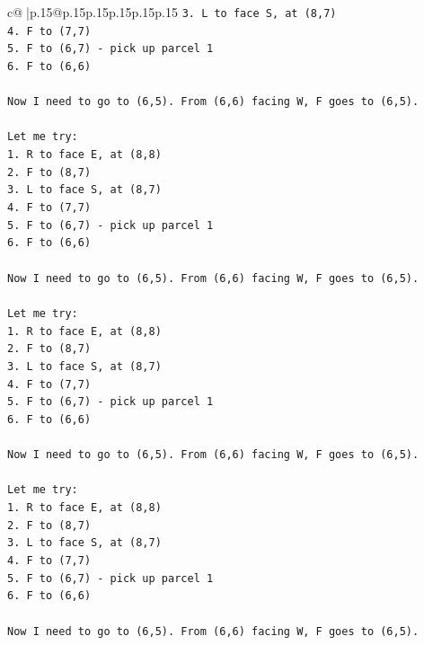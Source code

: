 \documentclass{article}
\begin{document}
{\begin{supertabular}{c@{$\;$}|p{.15\linewidth}@{}p{.15\linewidth}p{.15\linewidth}p{.15\linewidth}p{.15\linewidth}p{.15\linewidth}}
{{{\texttt{3. L to face S, at (8,7)} \\
\texttt{4. F to (7,7)} \\
\texttt{5. F to (6,7) {-} pick up parcel 1} \\
\texttt{6. F to (6,6)} \\
\\ 
\texttt{Now I need to go to (6,5). From (6,6) facing W, F goes to (6,5).} \\
\\ 
\texttt{Let me try:} \\
\texttt{1. R to face E, at (8,8)} \\
\texttt{2. F to (8,7)} \\
\texttt{3. L to face S, at (8,7)} \\
\texttt{4. F to (7,7)} \\
\texttt{5. F to (6,7) {-} pick up parcel 1} \\
\texttt{6. F to (6,6)} \\
\\ 
\texttt{Now I need to go to (6,5). From (6,6) facing W, F goes to (6,5).} \\
\\ 
\texttt{Let me try:} \\
\texttt{1. R to face E, at (8,8)} \\
\texttt{2. F to (8,7)} \\
\texttt{3. L to face S, at (8,7)} \\
\texttt{4. F to (7,7)} \\
\texttt{5. F to (6,7) {-} pick up parcel 1} \\
\texttt{6. F to (6,6)} \\
\\ 
\texttt{Now I need to go to (6,5). From (6,6) facing W, F goes to (6,5).} \\
\\ 
\texttt{Let me try:} \\
\texttt{1. R to face E, at (8,8)} \\
\texttt{2. F to (8,7)} \\
\texttt{3. L to face S, at (8,7)} \\
\texttt{4. F to (7,7)} \\
\texttt{5. F to (6,7) {-} pick up parcel 1} \\
\texttt{6. F to (6,6)} \\
\\ 
\texttt{Now I need to go to (6,5). From (6,6) facing W, F goes to (6,5).} \\
\\ 
}}}
\end{supertabular}}
\end{document}
